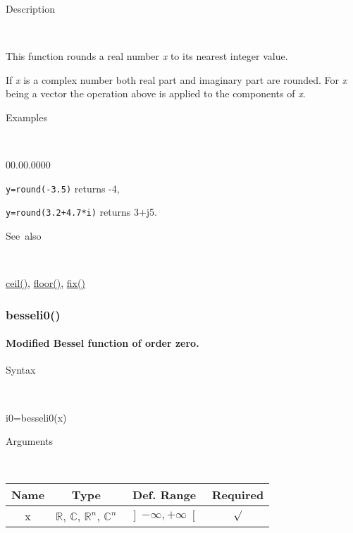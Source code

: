 \begin{description}
\item [Description]~
\end{description}
This function rounds a real number \textit{x} to its nearest integer
value. 

If \textit{x} is a complex number both real part and imaginary part
are rounded. For \textit{x} being a vector the operation above is
applied to the components of \textit{x}.

\begin{description}
\item [Examples]~
\end{description}
\begin{lyxlist}{00.00.0000}
\item [\texttt{y=round(-3.5)}]returns -4,
\item [\texttt{y=round(3.2+4.7{*}i)}]returns 3+j5.
\end{lyxlist}
\begin{description}
\item [See~also]~
\end{description}
\textcolor{blue}{\hyperlink{ceil}{ceil()}}\textcolor{black}{,} \textcolor{blue}{\hyperlink{floor}{floor()}}\textcolor{black}{,}
\textcolor{blue}{\hyperlink{fix}{fix()}}


\newpage
{}


\subsubsection*{\hypertarget{besseli0}{}{\Large besseli0()}}


\paragraph{\label{par:Modified-Bessel-function}Modified Bessel function of
order zero.}

\begin{description}
\item [Syntax]~
\end{description}
i0=besseli0(x)

\begin{description}
\item [Arguments]~
\end{description}
\begin{tabular}{|c|c|c|c|}
\hline 
Name&
Type&
Def. Range&
Required\tabularnewline
\hline
\hline 
x&
$\mathbb{R}$, $\mathbb{C}$, $\mathbb{R}^{n}$, $\mathbb{C}^{n}$&
$\left]-\infty,+\infty\right[$&
$\surd$\tabularnewline
\hline
\end{tabular}

